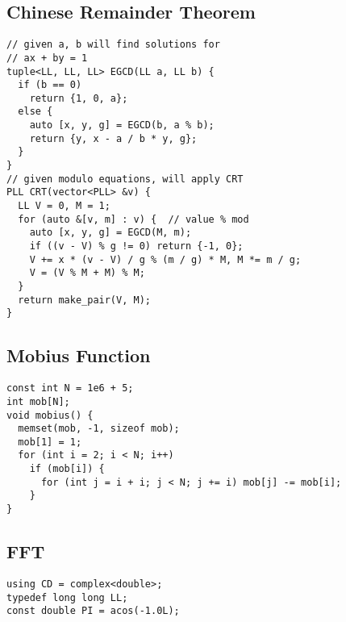 \documentclass[FSZ,a4paper,onesided]{article}
\begin{document}
\begin{multicols*}{\COLS}
\begin{lstlisting}
\end{lstlisting}
\subsection{Chinese Remainder Theorem}
\begin{lstlisting}
// given a, b will find solutions for
// ax + by = 1
tuple<LL, LL, LL> EGCD(LL a, LL b) {
  if (b == 0)
    return {1, 0, a};
  else {
    auto [x, y, g] = EGCD(b, a % b);
    return {y, x - a / b * y, g};
  }
}
// given modulo equations, will apply CRT
PLL CRT(vector<PLL> &v) {
  LL V = 0, M = 1;
  for (auto &[v, m] : v) {  // value % mod
    auto [x, y, g] = EGCD(M, m);
    if ((v - V) % g != 0) return {-1, 0};
    V += x * (v - V) / g % (m / g) * M, M *= m / g;
    V = (V % M + M) % M;
  }
  return make_pair(V, M);
}
\end{lstlisting}
\subsection{Mobius Function}
\begin{lstlisting}
const int N = 1e6 + 5;
int mob[N];
void mobius() {
  memset(mob, -1, sizeof mob);
  mob[1] = 1;
  for (int i = 2; i < N; i++)
    if (mob[i]) {
      for (int j = i + i; j < N; j += i) mob[j] -= mob[i];
    }
}

\end{lstlisting}
\subsection{FFT}
\begin{lstlisting}
using CD = complex<double>;
typedef long long LL;
const double PI = acos(-1.0L);


\end{lstlisting}
\end{multicols*}
\end{document}
